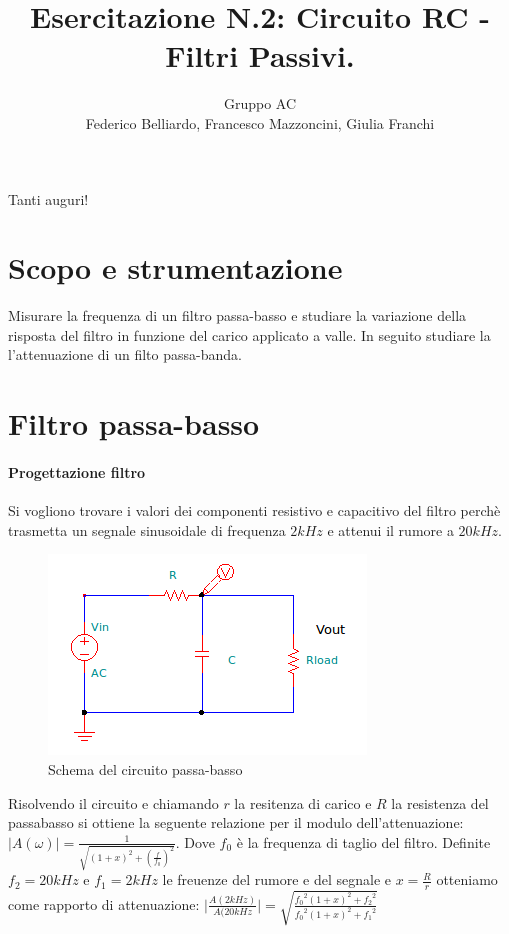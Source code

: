 \documentclass[10pt,a4paper]{article}
\author{Gruppo AC \\ Federico Belliardo, Francesco Mazzoncini, Giulia Franchi}
\title{Esercitazione N.2: Circuito RC - Filtri Passivi.}
\begin{document}
\maketitle

Tanti auguri!

\section{Scopo e strumentazione}

Misurare la frequenza di un filtro passa-basso e studiare la variazione della risposta del filtro in funzione del carico applicato a valle. In seguito studiare la l'attenuazione di un filto passa-banda.

\section{Filtro passa-basso}
\paragraph{Progettazione filtro}
Si vogliono trovare i valori dei componenti resistivo e capacitivo del filtro perchè trasmetta un segnale sinusoidale di frequenza $2kHz$ e attenui il rumore a $20kHz$.

\begin{figure}[h]
\centering
\includegraphics[scale=1.0]{passabasso.png}
\caption{Schema del circuito passa-basso}
\end{figure}

Risolvendo il circuito e chiamando $r$ la resitenza di carico e $R$ la resistenza del passabasso si ottiene la seguente relazione per il modulo dell'attenuazione:
$\vert A(\omega) \vert = \frac{1}{\sqrt{(1+x)^2+(\frac{f}{f_{0}})^2}} $. Dove $f_0$ è la frequenza di taglio del filtro. Definite $f_2 = 20 kHz$ e $f_1 = 2 kHz$ le freuenze del rumore e del segnale e $x = \frac {R}{r}$ otteniamo come rapporto di attenuazione: 
$\vert \frac{A(2 kHz)}{A(20 kHz} \vert = \sqrt{\frac{{f_0}^2 (1+x)^2 + {f_2}^2}{{f_0}^2 (1+x)^2 + {f_1}^2}}$
\end{document}
